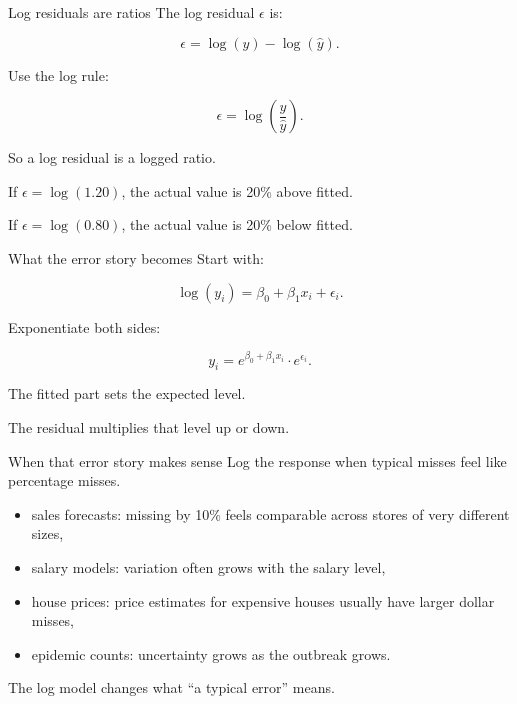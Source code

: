 \documentclass[
  ignorenonframetext,
  aspectratio=43,
]{beamer}
\providecommand{\tightlist}{%
  \setlength{\itemsep}{0pt}\setlength{\parskip}{0pt}}\usepackage{longtable,booktabs,array}
\begin{document}
\begin{frame}{Log residuals are ratios}
\label{log-residuals-are-ratios}
The log residual \(\epsilon\) is:

\[
\epsilon = \log(y) - \log(\widehat{y}).
\]

Use the log rule:

\[
\epsilon = \log\left(\frac{y}{\widehat{y}}\right).
\]

So a log residual is a logged ratio.

If \(\epsilon = \log(1.20)\), the actual value is 20\% above fitted.

If \(\epsilon = \log(0.80)\), the actual value is 20\% below fitted.
\end{frame}

\begin{frame}{What the error story becomes}
\label{what-the-error-story-becomes}
Start with:

\[
\log(y_i) = \beta_0 + \beta_1x_i + \epsilon_i.
\]

Exponentiate both sides:

\[
y_i = e^{\beta_0 + \beta_1x_i} \cdot e^{\epsilon_i}.
\]

The fitted part sets the expected level.

The residual multiplies that level up or down.
\end{frame}

\begin{frame}{When that error story makes sense}
\label{when-that-error-story-makes-sense}
Log the response when typical misses feel like percentage misses.

\begin{itemize}
\tightlist
\item
  sales forecasts: missing by 10\% feels comparable across stores of
  very different sizes,
\item
  salary models: variation often grows with the salary level,
\item
  house prices: price estimates for expensive houses usually have larger
  dollar misses,
\item
  epidemic counts: uncertainty grows as the outbreak grows.
\end{itemize}

The log model changes what ``a typical error'' means.
\end{frame}
\end{document}
